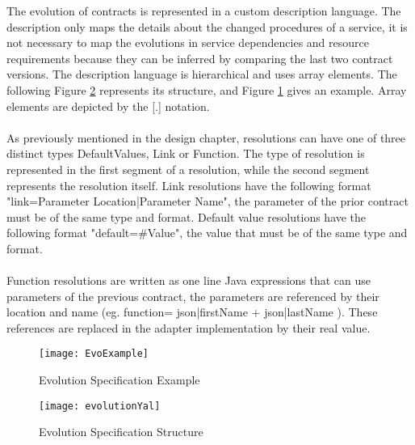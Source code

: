 The evolution of contracts is represented in a custom description language.
The description only maps the details about the changed procedures of a service,
it is not necessary to map the evolutions in service dependencies and resource requirements because they can be inferred by comparing the last two contract versions.
The description language is hierarchical and uses array elements.
The following Figure \ref{fig:evolution_yal} represents its structure, and Figure \ref{fig:evolution_example} gives an example.
Array elements are depicted by the [.] notation.

\paragraph{}

As previously mentioned in the design chapter, resolutions can have one of three distinct types
DefaultValues, Link or Function.
The type of resolution is represented in the first segment of a resolution, while the second segment represents the resolution itself.
Link resolutions have the following format "link={Parameter Location}|{Parameter Name}", the parameter of the prior contract must be of the same type and format.
Default value resolutions have the following format "default=#Value", the value that must be of the same type and format.

\paragraph{}

Function resolutions are written as one line Java expressions that can use parameters of the previous contract, the
parameters are referenced by their location and name (eg. function= {{json|firstName}} + {{json|lastName}} ).
These references are replaced in the adapter implementation by their real value.

\begin{figure}[htbp]
    \centering
    \texttt{[image: EvoExample]}
    \caption{Evolution Specification Example}
    \label{fig:evolution_example}
\end{figure}

\begin{figure}[htbp]
    \centering
    \texttt{[image: evolutionYal]}
    \caption{Evolution Specification Structure}
    \label{fig:evolution_yal}
\end{figure}

\newpage

